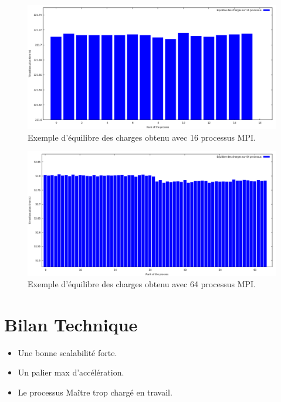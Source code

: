 	\begin{frame}
	\begin{figure}[!ht]	
		\begin{center}\includegraphics[scale=0.35]{equilibre8.png}\end{center}
		\caption{Exemple d'équilibre des charges obtenu avec 16 processus MPI.}
		\label{fg:fig6}
	\end{figure}	
	\end{frame}
	
	\begin{frame}
	\begin{figure}[!ht]	
		\begin{center}\includegraphics[scale=0.35]{equilibre64.png}\end{center}
		\caption{Exemple d'équilibre des charges obtenu avec 64 processus MPI.}
		\label{fg:fig7}
	\end{figure}	
	\end{frame}
	
	\section{Bilan Technique}
	 
\begin{frame}
\begin{itemize}
\item Une bonne scalabilité forte. \vspace{2em}
\item Un palier max d’accélération.\vspace{2em}
\item Le processus Maître trop chargé en travail.\\
\end{itemize}
\end{frame}

